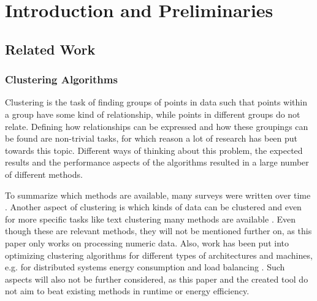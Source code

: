 \documentclass[
	a4paper,
	english,
	twoside,
	openright,               
	11pt                            
	]{report}
\begin{document}




\tableofcontents
 \cleardoublepage
%
%
\listoffigures
\cleardoublepage



 \part{Introduction and Preliminaries}
   \setcounter{page}{1}
 


\chapter{Related Work}\label{cha:related_work}
\section{Clustering Algorithms}

Clustering is the task of finding groups of points in data such that points within a group have some kind of relationship, while points in different groups do not relate. Defining how relationships can be expressed and how these groupings can be found are non-trivial tasks, for which reason a lot of research has been put towards this topic. Different ways of thinking about this problem, the expected results and the performance aspects of the algorithms resulted in a large number of different methods. 

 To summarize which methods are available, many surveys were written over time \cite{7154919,1427769,7414675,surveyclustering}. Another aspect of clustering is which kinds of data can be clustered and even for more specific tasks like text clustering many methods are available \cite{5982288}. Even though these are relevant methods, they will not be mentioned further on, as this paper only works on processing numeric data. Also, work has been put into optimizing clustering algorithms for different types of architectures and machines, e.g. for distributed systems \cite{6322592} energy consumption and load balancing \cite{7586361}. Such aspects will also not be further considered, as this paper and the created tool do not aim to beat existing methods in runtime or energy efficiency.
\end{document}
